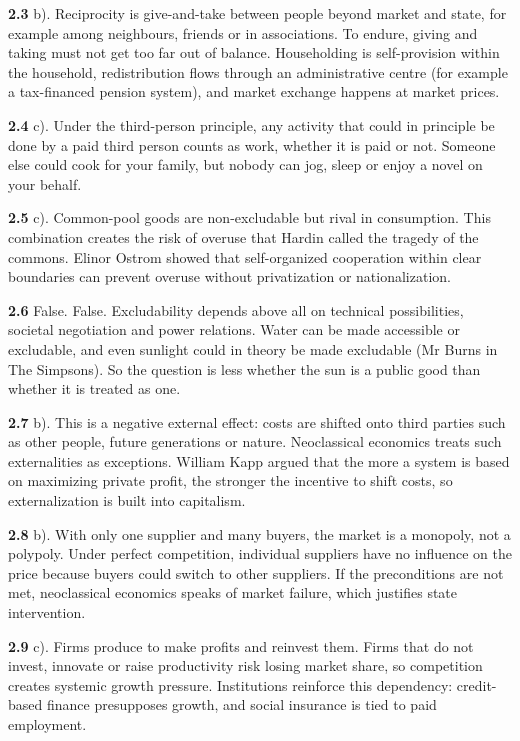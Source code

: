 \documentclass[
  british,
  a4paper,
  DIV=11,
  numbers=noendperiod,
  oneside,
  openany]{scrreprt}
\begin{document}
\textbf{2.3} b). Reciprocity is give-and-take between people beyond
market and state, for example among neighbours, friends or in
associations. To endure, giving and taking must not get too far out of
balance. Householding is self-provision within the household,
redistribution flows through an administrative centre (for example a
tax-financed pension system), and market exchange happens at market
prices.

\textbf{2.4} c). Under the third-person principle, any activity that
could in principle be done by a paid third person counts as work,
whether it is paid or not. Someone else could cook for your family, but
nobody can jog, sleep or enjoy a novel on your behalf.

\textbf{2.5} c). Common-pool goods are non-excludable but rival in
consumption. This combination creates the risk of overuse that Hardin
called the tragedy of the commons. Elinor Ostrom showed that
self-organized cooperation within clear boundaries can prevent overuse
without privatization or nationalization.

\textbf{2.6} False. False. Excludability depends above all on technical
possibilities, societal negotiation and power relations. Water can be
made accessible or excludable, and even sunlight could in theory be made
excludable (Mr Burns in The Simpsons). So the question is less whether
the sun is a public good than whether it is treated as one.

\textbf{2.7} b). This is a negative external effect: costs are shifted
onto third parties such as other people, future generations or nature.
Neoclassical economics treats such externalities as exceptions. William
Kapp argued that the more a system is based on maximizing private
profit, the stronger the incentive to shift costs, so externalization is
built into capitalism.

\textbf{2.8} b). With only one supplier and many buyers, the market is a
monopoly, not a polypoly. Under perfect competition, individual
suppliers have no influence on the price because buyers could switch to
other suppliers. If the preconditions are not met, neoclassical
economics speaks of market failure, which justifies state intervention.

\textbf{2.9} c). Firms produce to make profits and reinvest them. Firms
that do not invest, innovate or raise productivity risk losing market
share, so competition creates systemic growth pressure. Institutions
reinforce this dependency: credit-based finance presupposes growth, and
social insurance is tied to paid employment.
\end{document}
